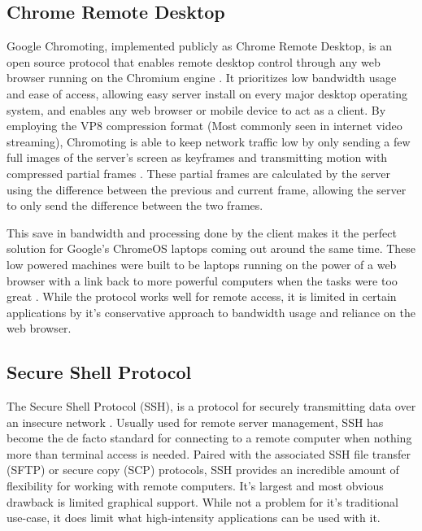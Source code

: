 \subsection{Chrome Remote Desktop}\label{subsec:ChromeRemoteDesktop}

Google Chromoting, implemented publicly as Chrome Remote Desktop, is an open source protocol that enables remote desktop control through any web browser running on the Chromium engine \cite{chromotingBuildInstructions}.
It prioritizes low bandwidth usage and ease of access, allowing easy server install on every major desktop operating system, and enables any web browser or mobile device to act as a client.
By employing the VP8 compression format (Most commonly seen in internet video streaming), Chromoting is able to keep network traffic low by only sending a few full images of the server's screen as keyframes and transmitting motion with compressed partial frames \cite{miniorange_chromoting}.
These partial frames are calculated by the server using the difference between the previous and current frame, allowing the server to only send the difference between the two frames.

This save in bandwidth and processing done by the client makes it the perfect solution for Google's ChromeOS laptops coming out around the same time.
These low powered machines were built to be laptops running on the power of a web browser with a link back to more powerful computers when the tasks were too great \cite{upson_sengupta_2012}.
While the protocol works well for remote access, it is limited in certain applications by it's conservative approach to bandwidth usage and reliance on the web browser.


\subsection{Secure Shell Protocol}\label{subsec:SecureShellProtocol}

The Secure Shell Protocol (SSH), is a protocol for securely transmitting data over an insecure network \cite{rfc4251}.
Usually used for remote server management, SSH has become the de facto standard for connecting to a remote computer when nothing more than terminal access is needed.
Paired with the associated SSH file transfer (SFTP) or secure copy (SCP) protocols, SSH provides an incredible amount of flexibility for working with remote computers.
It's largest and most obvious drawback is limited graphical support.
While not a problem for it's traditional use-case, it does limit what high-intensity applications can be used with it.

